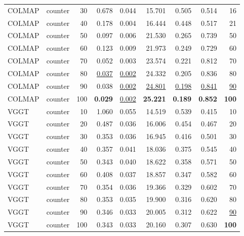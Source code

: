\begin{table}[H]
\begin{tabular}{llrrrrrrr}
COLMAP & counter & 30 & 0.678 & 0.044 & 15.701 & 0.505 & 0.514 & 16 \\
COLMAP & counter & 40 & 0.178 & 0.004 & 16.444 & 0.448 & 0.517 & 21 \\
COLMAP & counter & 50 & 0.097 & 0.006 & 21.530 & 0.265 & 0.739 & 50 \\
COLMAP & counter & 60 & 0.123 & 0.009 & 21.973 & 0.249 & 0.729 & 60 \\
COLMAP & counter & 70 & 0.052 & 0.003 & 23.574 & 0.221 & 0.812 & 70 \\
COLMAP & counter & 80 & \underline{0.037} & \underline{0.002} & 24.332 & 0.205 & 0.836 & 80 \\
COLMAP & counter & 90 & 0.038 & \underline{0.002} & \underline{24.801} & \underline{0.198} & \underline{0.841} & \underline{90} \\
COLMAP & counter & 100 & \textbf{0.029} & \underline{0.002} & \textbf{25.221} & \textbf{0.189} & \textbf{0.852} & \textbf{100} \\
VGGT & counter & 10 & 1.060 & 0.055 & 14.519 & 0.539 & 0.415 & 10 \\
VGGT & counter & 20 & 0.487 & 0.036 & 16.006 & 0.454 & 0.467 & 20 \\
VGGT & counter & 30 & 0.353 & 0.036 & 16.945 & 0.416 & 0.501 & 30 \\
VGGT & counter & 40 & 0.357 & 0.041 & 18.036 & 0.375 & 0.545 & 40 \\
VGGT & counter & 50 & 0.343 & 0.040 & 18.622 & 0.358 & 0.571 & 50 \\
VGGT & counter & 60 & 0.408 & 0.037 & 18.857 & 0.347 & 0.582 & 60 \\
VGGT & counter & 70 & 0.354 & 0.036 & 19.366 & 0.329 & 0.602 & 70 \\
VGGT & counter & 80 & 0.353 & 0.035 & 19.900 & 0.316 & 0.620 & 80 \\
VGGT & counter & 90 & 0.346 & 0.033 & 20.005 & 0.312 & 0.622 & \underline{90} \\
VGGT & counter & 100 & 0.343 & 0.033 & 20.160 & 0.307 & 0.630 & \textbf{100} \\
\bottomrule
\end{tabular}
\end{table}